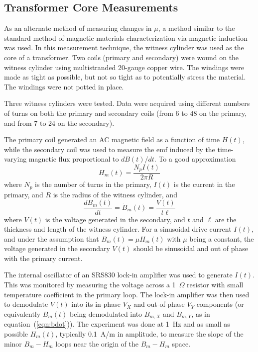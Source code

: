 
\subsection{Transformer Core Measurements}
\label{sec:transformer}

As an alternate method of measuring changes in $\mu$, a method similar
to the standard method of magnetic materials characterization via
magnetic induction was used.  In this measurement technique, the
witness cylinder was used as the core of a transformer.  Two coils
(primary and secondary) were wound on the witness cylinder using
multistranded 20-gauge copper wire.  The windings were made as tight
as possible, but not so tight as to potentially stress the material.
The windings were not potted in place.

Three witness cylinders were tested.  Data were acquired
using different numbers of turns on both the primary and secondary
coils (from 6 to 48 on the primary, and from 7 to 24 on the
secondary).



The primary coil generated an AC magnetic field as a function of time
$H(t)$, while the secondary coil was used to measure the emf induced
by the time-varying magnetic flux proportional to $dB(t)/dt$.  To a
good approximation
\begin{equation}
H_m(t)=\frac{N_pI(t)}{2\pi R}
\end{equation}
where $N_p$ is the number of turns in the primary, $I(t)$ is the
current in the primary, and $R$ is the radius of the witness cylinder,
and
\begin{equation}
\frac{dB_m(t)}{dt}=\dot{B}_m(t)=\frac{V(t)}{t\ell}
\label{eqn:bdot}
\end{equation}
where $V(t)$ is the voltage generated in the secondary, and $t$ and
$\ell$ are the thickness and length of the witness cylinder.  For a
sinusoidal drive current $I(t)$, and under the assumption that
$B_m(t)=\mu H_m(t)$ with $\mu$ being a constant, the voltage generated
in the secondary $V(t)$ should be sinusoidal and out of phase with the
primary current.

The internal oscillator of an SRS830 lock-in amplifier was used to
generate $I(t)$.  This was monitored by measuring the voltage across a
1~$\Omega$ resistor with small temperature coefficient in the primary
loop.  The lock-in amplifier was then used to demodulate $V(t)$ into
its in-phase $V_X$ and out-of-phase $V_Y$ components (or equivalently
$\dot{B}_m(t)$ being demodulated into $\dot{B}_{m,X}$ and
$\dot{B}_{m,Y}$, as in equation~(\ref{eqn:bdot})).  The experiment was
done at 1~Hz and as small as possible $H_m(t)$, typically 0.1~A/m in
amplitude, to measure the slope of the minor $B_m-H_m$ loops near the
origin of the $B_m-H_m$ space.


